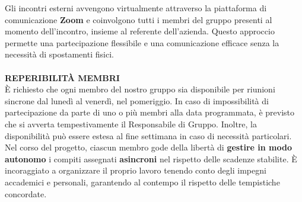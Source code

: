 \documentclass{article}
\begin{document}
Gli incontri esterni avvengono virtualmente attraverso la piattaforma di comunicazione \textbf{Zoom} e coinvolgono tutti i membri del gruppo presenti al momento dell'incontro, insieme al referente dell'azienda. Questo approccio permette una partecipazione flessibile e una comunicazione efficace senza la necessità di spostamenti fisici.\\\\
\textbf{REPERIBILITÀ MEMBRI}\\
È richiesto che ogni membro del nostro gruppo sia disponibile per riunioni sincrone dal lunedì al venerdì, nel pomeriggio. In caso di impossibilità di partecipazione da parte di uno o più membri alla data programmata, è previsto che si avverta tempestivamente il Responsabile di Gruppo. Inoltre, la disponibilità può essere estesa al fine settimana in caso di necessità particolari.\\
Nel corso del progetto, ciascun membro gode della libertà di \textbf{gestire in modo autonomo} i compiti assegnati \textbf{asincroni} nel rispetto delle scadenze stabilite. È incoraggiato a organizzare il proprio lavoro tenendo conto degli impegni accademici e personali, garantendo al contempo il rispetto delle tempistiche concordate.\\
\end{document}
